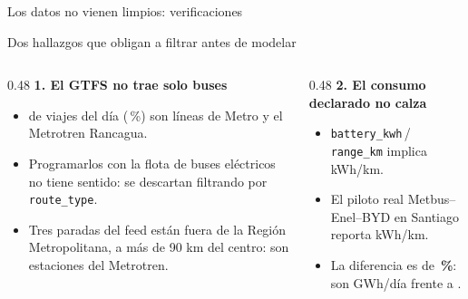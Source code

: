 \documentclass[aspectratio=169,11pt]{beamer}
\newcommand{\RES}{../../03-resultados}
\begin{document}
\begin{frame}{Los datos no vienen limpios: \chequeosTotal{} verificaciones}
  \scriptsize
  
  \vspace{4pt}
\end{frame}

\begin{frame}{Dos hallazgos que obligan a filtrar antes de modelar}
  \small
  \begin{columns}[t]
    \begin{column}{0.48\textwidth}
      {\color{ink}\bfseries 1. El GTFS no trae solo buses}
      \begin{itemize}\footnotesize
        \item \viajesNoBus{} de \viajesDelDia{} viajes del día
              (\pctNoBus\,\%) son líneas de Metro y el Metrotren Rancagua.
        \item Programarlos con la flota de buses eléctricos no tiene sentido:
              se descartan filtrando por \texttt{route\_type}.
        \item Tres paradas del feed están fuera de la Región Metropolitana,
              a más de 90 km del centro: son estaciones del Metrotren.
      \end{itemize}
    \end{column}
    \begin{column}{0.48\textwidth}
      {\color{ink}\bfseries 2. El consumo declarado no calza}
      \begin{itemize}\footnotesize
        \item \texttt{battery\_kwh}\,/\,\texttt{range\_km} implica
              \consumoImplicito{} kWh/km.
        \item El piloto real Metbus--Enel--BYD en Santiago reporta
              \consumoReal{} kWh/km.
        \item La diferencia es de \textbf{\desvioConsumo\,\%}: son \energiaImplicita{} GWh/día
              frente a \energiaReal{}.
      \end{itemize}
    \end{column}
  \end{columns}
\end{frame}
\end{document}

